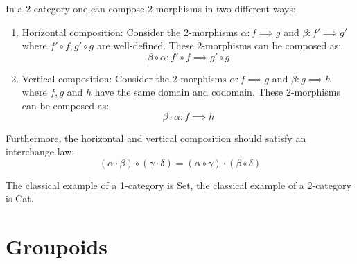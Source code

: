 {	
	\begin{example}[2-Category]
		In a 2-category one can compose 2-morphisms in two different ways:
		\begin{enumerate}
			\item Horizontal composition:
			Consider the 2-morphisms $\alpha:f\implies g$ and $\beta:f'\implies g'$ where $f'\circ f, g'\circ g$ are well-defined. These 2-morphisms can be composed as: \[\beta\circ\alpha: f'\circ f\implies g'\circ g\]
			\item Vertical composition:
			Consider the 2-morphisms $\alpha:f\implies g$ and $\beta:g\implies h$ where $f, g$ and $h$ have the same domain and codomain. These 2-morphisms can be composed as: \[\beta\cdot\alpha: f\implies h\]
		\end{enumerate}
		Furthermore, the horizontal and vertical composition should satisfy an interchange law:
		\begin{equation}
			(\alpha\cdot\beta)\circ(\gamma\cdot\delta) = (\alpha\circ\gamma)\cdot(\beta\circ\delta)
		\end{equation}
	\end{example}
	
	
	\begin{example}
		The classical example of a 1-category is Set, the classical example of a 2-category is Cat.
	\end{example}

\section{Groupoids}

	
}
